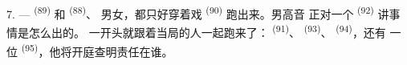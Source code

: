 7. ---  \textsuperscript{(89)} 和 \textsuperscript{(88)}、
男女，都只好穿着戏 \textsuperscript{(90)} 跑出来。男高音
正对一个 \textsuperscript{(92)} 讲事情是怎么出的。
一开头就跟着当局的人一起跑来了： \textsuperscript{(91)}、
 \textsuperscript{(93)}、 \textsuperscript{(94)}，还有
一位 \textsuperscript{(95)}，他将开庭查明责任在谁。
\VUsaut{6.0mm}
\VUfilet{22mm}
